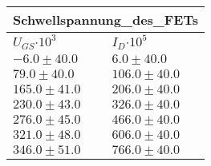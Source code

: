 \documentclass{article}
\begin{document}
\begin{tabular}{|p{3cm}|p{3cm}|}
\hline
\multicolumn{2}{|c|}{Schwellspannung_des_FETs}\\
\hline
$U_{GS}$$\cdot 10^{3}$&$I_D$$\cdot 10^{5}$\\
\hline
$-6.0\pm40.0$&$6.0\pm 40.0$\\
$79.0\pm40.0$&$106.0\pm 40.0$\\
$165.0\pm41.0$&$206.0\pm 40.0$\\
$230.0\pm43.0$&$326.0\pm 40.0$\\
$276.0\pm45.0$&$466.0\pm 40.0$\\
$321.0\pm48.0$&$606.0\pm 40.0$\\
$346.0\pm51.0$&$766.0\pm 40.0$\\
\hline
\end{tabular}
\end{document}
